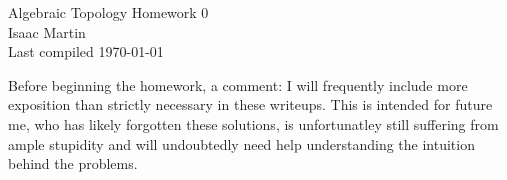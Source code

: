 

\def\sset{\subseteq}
\def\iso{\cong}
\def\gend#1{\langle #1\rangle}

\newcommand{\rightoverleftarrow}{%
  \mathrel{\vcenter{\mathsurround0pt
    \ialign{##\crcr
      \noalign{\nointerlineskip}$\longrightarrow$\crcr
      \noalign{\nointerlineskip}$\longleftarrow$\crcr
    }%
  }}%
}


\pagestyle{empty}
	\LARGE
\begin{center}
	Algebraic Topology Homework 0 \\
	\Large
	Isaac Martin \\
    Last compiled \today
\end{center}
\normalsize
\vspace{-2mm}
\hru
Before beginning the homework, a comment: I will frequently include more exposition than strictly necessary in these writeups. This is intended for future me, who has likely forgotten these solutions, is unfortunatley still suffering from ample stupidity and will undoubtedly need help understanding the intuition behind the problems.

